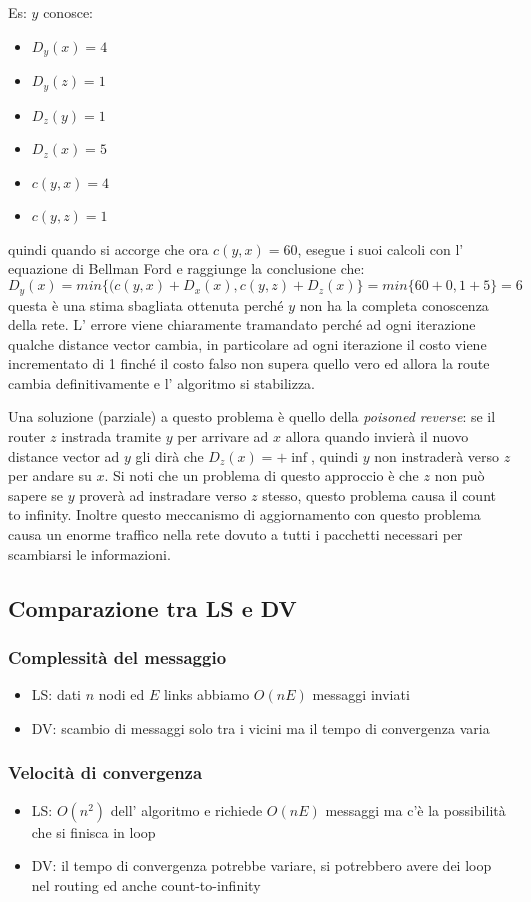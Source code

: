 Es: $y$ conosce:
\begin{itemize}
    \item $D_y(x) = 4$
    \item $D_y(z) = 1$
    \item $D_z(y) = 1$
    \item $D_z(x) = 5$
    \item $c(y,x) = 4$
    \item $c(y,z) = 1$
\end{itemize}
quindi quando si accorge che ora $c(y,x)=60$, esegue i suoi calcoli con l' equazione di Bellman Ford e raggiunge la conclusione che:
$$D_y(x) = min\{(c(y,x)+D_x(x), c(y,z)+D_z(x)\} = min\{60+0, 1+5\} = 6$$
questa è una stima sbagliata ottenuta perché $y$ non ha la completa conoscenza della rete.
L' errore viene chiaramente tramandato perché ad ogni iterazione qualche distance vector cambia, in particolare ad ogni iterazione il costo viene incrementato di 1 finché il costo falso non supera quello vero ed allora la route cambia definitivamente e l' algoritmo si stabilizza.

Una soluzione (parziale) a questo problema è quello della \emph{poisoned reverse}: se il router $z$ instrada tramite $y$ per arrivare ad $x$ allora quando invierà il nuovo distance vector ad $y$ gli dirà che $D_z(x) = + \inf$, quindi $y$ non instraderà verso $z$ per andare su $x$.
Si noti che un problema di questo approccio è che $z$ non può sapere se $y$ proverà ad instradare verso $z$ stesso, questo problema causa il count to infinity.
Inoltre questo meccanismo di aggiornamento con questo problema causa un enorme traffico nella rete dovuto a tutti i pacchetti necessari per scambiarsi le informazioni.

\subsection{Comparazione tra LS e DV}
\subsubsection{Complessità del messaggio}
\begin{itemize}
    \item LS: dati $n$ nodi ed $E$ links abbiamo $O(nE)$ messaggi inviati
    \item DV: scambio di messaggi solo tra i vicini ma il tempo di convergenza varia
\end{itemize}

\subsubsection{Velocità di convergenza}
\begin{itemize}
    \item LS: $O(n^2)$ dell' algoritmo e richiede $O(nE)$ messaggi ma c'è la possibilità che si finisca in loop
    
    \item DV: il tempo di convergenza potrebbe variare, si potrebbero avere dei loop nel routing ed anche count-to-infinity
\end{itemize}

